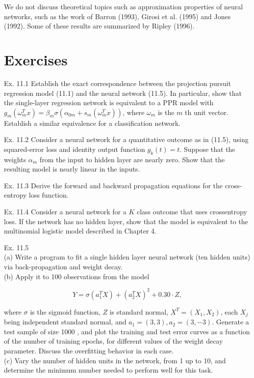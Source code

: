 \documentclass[10pt]{article}
\begin{document}
We do not discuss theoretical topics such as approximation properties of neural networks, such as the work of Barron (1993), Girosi et al. (1995) and Jones (1992). Some of these results are summarized by Ripley (1996).

\section*{Exercises}
Ex. 11.1 Establish the exact correspondence between the projection pursuit regression model (11.1) and the neural network (11.5). In particular, show that the single-layer regression network is equivalent to a PPR model with $g_{m}\left(\omega_{m}^{T} x\right)=\beta_{m} \sigma\left(\alpha_{0 m}+s_{m}\left(\omega_{m}^{T} x\right)\right)$, where $\omega_{m}$ is the $m$ th unit vector. Establish a similar equivalence for a classification network.

Ex. 11.2 Consider a neural network for a quantitative outcome as in (11.5), using squared-error loss and identity output function $g_{k}(t)=t$. Suppose that the weights $\alpha_{m}$ from the input to hidden layer are nearly zero. Show that the resulting model is nearly linear in the inputs.

Ex. 11.3 Derive the forward and backward propagation equations for the cross-entropy loss function.

Ex. 11.4 Consider a neural network for a $K$ class outcome that uses crossentropy loss. If the network has no hidden layer, show that the model is equivalent to the multinomial logistic model described in Chapter 4.

Ex. 11.5\\
(a) Write a program to fit a single hidden layer neural network (ten hidden units) via back-propagation and weight decay.\\
(b) Apply it to 100 observations from the model

$$
Y=\sigma\left(a_{1}^{T} X\right)+\left(a_{2}^{T} X\right)^{2}+0.30 \cdot Z,
$$

where $\sigma$ is the sigmoid function, $Z$ is standard normal, $X^{T}=\left(X_{1}, X_{2}\right)$, each $X_{j}$ being independent standard normal, and $a_{1}=(3,3), a_{2}= (3,-3)$. Generate a test sample of size 1000 , and plot the training and test error curves as a function of the number of training epochs, for different values of the weight decay parameter. Discuss the overfitting behavior in each case.\\
(c) Vary the number of hidden units in the network, from 1 up to 10, and determine the minimum number needed to perform well for this task.
\end{document}
